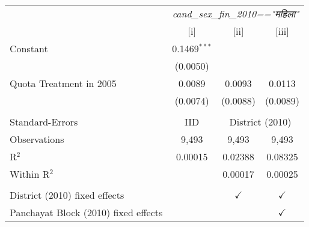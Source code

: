 
\begingroup
\centering
\begin{tabular}{lccc}
   \toprule
    & \multicolumn{3}{c}{\textit{cand\_sex\_fin\_2010=="महिला"}}\\
                                        & [i]            & [ii]          & [iii]\\  
   \midrule 
   Constant                             & 0.1469$^{***}$ &               &   \\   
                                        & (0.0050)       &               &   \\   
   Quota Treatment in 2005              & 0.0089         & 0.0093        & 0.0113\\   
                                        & (0.0074)       & (0.0088)      & (0.0089)\\   
    \\
   Standard-Errors & IID & \multicolumn{2}{c}{District (2010)} \\ 
   Observations                         & 9,493          & 9,493         & 9,493\\  
   R$^2$                                & 0.00015        & 0.02388       & 0.08325\\  
   Within R$^2$                         &                & 0.00017       & 0.00025\\  
    \\
   District (2010) fixed effects        &                & $\checkmark$  & $\checkmark$\\   
   Panchayat Block (2010) fixed effects &                &               & $\checkmark$\\   
   \bottomrule
\end{tabular}
\par\endgroup


